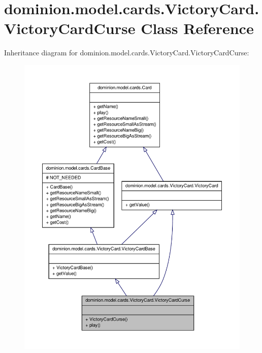 \hypertarget{classdominion_1_1model_1_1cards_1_1VictoryCard_1_1VictoryCardCurse}{\section{dominion.\-model.\-cards.\-Victory\-Card.\-Victory\-Card\-Curse \-Class \-Reference}
\label{classdominion_1_1model_1_1cards_1_1VictoryCard_1_1VictoryCardCurse}
}


\-Inheritance diagram for dominion.\-model.\-cards.\-Victory\-Card.\-Victory\-Card\-Curse\-:
\nopagebreak
\begin{figure}[H]
\begin{center}
\leavevmode
\includegraphics[width=350pt]{classdominion_1_1model_1_1cards_1_1VictoryCard_1_1VictoryCardCurse__inherit__graph}
\end{center}
\end{figure}


